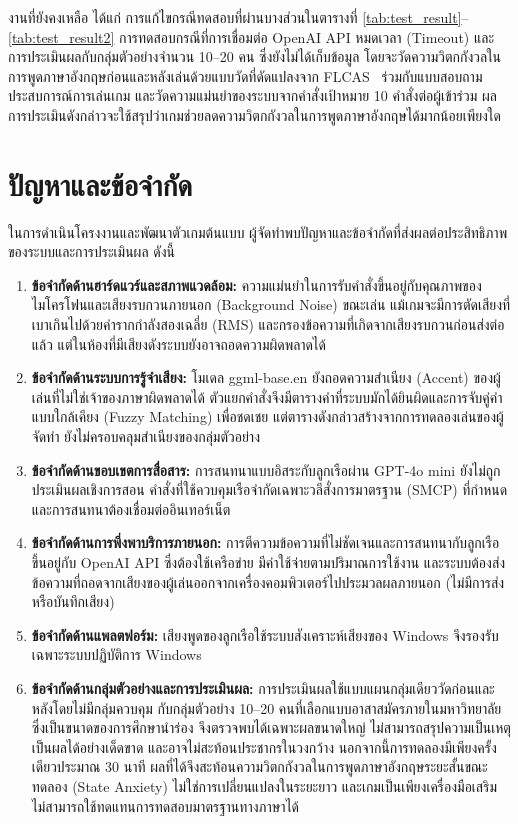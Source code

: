 งานที่ยังคงเหลือ ได้แก่ การแก้ไขกรณีทดสอบที่ผ่านบางส่วนในตารางที่ \ref{tab:test_result}--\ref{tab:test_result2} การทดสอบกรณีที่การเชื่อมต่อ OpenAI API หมดเวลา (Timeout) และการประเมินผลกับกลุ่มตัวอย่างจำนวน 10--20 คน ซึ่งยังไม่ได้เก็บข้อมูล โดยจะวัดความวิตกกังวลในการพูดภาษาอังกฤษก่อนและหลังเล่นด้วยแบบวัดที่ดัดแปลงจาก FLCAS~\cite{horwitz1986} ร่วมกับแบบสอบถามประสบการณ์การเล่นเกม และวัดความแม่นยำของระบบจากคำสั่งเป้าหมาย 10 คำสั่งต่อผู้เข้าร่วม ผลการประเมินดังกล่าวจะใช้สรุปว่าเกมช่วยลดความวิตกกังวลในการพูดภาษาอังกฤษได้มากน้อยเพียงใด

\section{ปัญหาและข้อจำกัด}

ในการดำเนินโครงงานและพัฒนาตัวเกมต้นแบบ ผู้จัดทำพบปัญหาและข้อจำกัดที่ส่งผลต่อประสิทธิภาพของระบบและการประเมินผล ดังนี้

\begin{enumerate}[label=\arabic*)]
    \item \textbf{ข้อจำกัดด้านฮาร์ดแวร์และสภาพแวดล้อม:} ความแม่นยำในการรับคำสั่งขึ้นอยู่กับคุณภาพของไมโครโฟนและเสียงรบกวนภายนอก (Background Noise) ขณะเล่น แม้เกมจะมีการตัดเสียงที่เบาเกินไปด้วยค่ารากกำลังสองเฉลี่ย (RMS) และกรองข้อความที่เกิดจากเสียงรบกวนก่อนส่งต่อแล้ว แต่ในห้องที่มีเสียงดังระบบยังอาจถอดความผิดพลาดได้
    \item \textbf{ข้อจำกัดด้านระบบการรู้จำเสียง:} โมเดล ggml-base.en ยังถอดความสำเนียง (Accent) ของผู้เล่นที่ไม่ใช่เจ้าของภาษาผิดพลาดได้ ตัวแยกคำสั่งจึงมีตารางคำที่ระบบมักได้ยินผิดและการจับคู่คำแบบใกล้เคียง (Fuzzy Matching) เพื่อชดเชย แต่ตารางดังกล่าวสร้างจากการทดลองเล่นของผู้จัดทำ ยังไม่ครอบคลุมสำเนียงของกลุ่มตัวอย่าง
    \item \textbf{ข้อจำกัดด้านขอบเขตการสื่อสาร:} การสนทนาแบบอิสระกับลูกเรือผ่าน GPT-4o mini ยังไม่ถูกประเมินผลเชิงการสอน คำสั่งที่ใช้ควบคุมเรือจำกัดเฉพาะวลีสั่งการมาตรฐาน (SMCP) ที่กำหนด และการสนทนาต้องเชื่อมต่ออินเทอร์เน็ต
    \item \textbf{ข้อจำกัดด้านการพึ่งพาบริการภายนอก:} การตีความข้อความที่ไม่ชัดเจนและการสนทนากับลูกเรือขึ้นอยู่กับ OpenAI API ซึ่งต้องใช้เครือข่าย มีค่าใช้จ่ายตามปริมาณการใช้งาน และระบบต้องส่งข้อความที่ถอดจากเสียงของผู้เล่นออกจากเครื่องคอมพิวเตอร์ไปประมวลผลภายนอก (ไม่มีการส่งหรือบันทึกเสียง)
    \item \textbf{ข้อจำกัดด้านแพลตฟอร์ม:} เสียงพูดของลูกเรือใช้ระบบสังเคราะห์เสียงของ Windows จึงรองรับเฉพาะระบบปฏิบัติการ Windows
    \item \textbf{ข้อจำกัดด้านกลุ่มตัวอย่างและการประเมินผล:} การประเมินผลใช้แบบแผนกลุ่มเดียววัดก่อนและหลังโดยไม่มีกลุ่มควบคุม กับกลุ่มตัวอย่าง 10--20 คนที่เลือกแบบอาสาสมัครภายในมหาวิทยาลัย ซึ่งเป็นขนาดของการศึกษานำร่อง จึงตรวจพบได้เฉพาะผลขนาดใหญ่ ไม่สามารถสรุปความเป็นเหตุเป็นผลได้อย่างเด็ดขาด และอาจไม่สะท้อนประชากรในวงกว้าง นอกจากนี้การทดลองมีเพียงครั้งเดียวประมาณ 30 นาที ผลที่ได้จึงสะท้อนความวิตกกังวลในการพูดภาษาอังกฤษระยะสั้นขณะทดลอง (State Anxiety) ไม่ใช่การเปลี่ยนแปลงในระยะยาว และเกมเป็นเพียงเครื่องมือเสริม ไม่สามารถใช้ทดแทนการทดสอบมาตรฐานทางภาษาได้
\end{enumerate}

